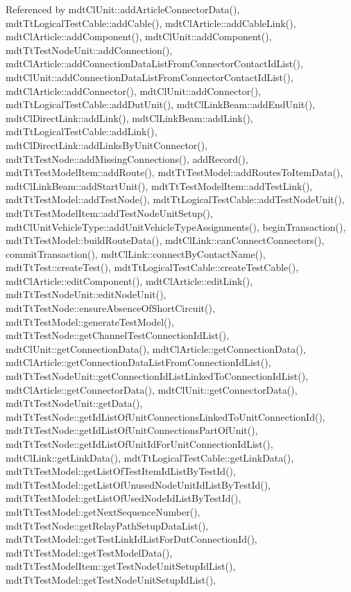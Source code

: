 Referenced by mdt\-Cl\-Unit\-::add\-Article\-Connector\-Data(), mdt\-Tt\-Logical\-Test\-Cable\-::add\-Cable(), mdt\-Cl\-Article\-::add\-Cable\-Link(), mdt\-Cl\-Article\-::add\-Component(), mdt\-Cl\-Unit\-::add\-Component(), mdt\-Tt\-Test\-Node\-Unit\-::add\-Connection(), mdt\-Cl\-Article\-::add\-Connection\-Data\-List\-From\-Connector\-Contact\-Id\-List(), mdt\-Cl\-Unit\-::add\-Connection\-Data\-List\-From\-Connector\-Contact\-Id\-List(), mdt\-Cl\-Article\-::add\-Connector(), mdt\-Cl\-Unit\-::add\-Connector(), mdt\-Tt\-Logical\-Test\-Cable\-::add\-Dut\-Unit(), mdt\-Cl\-Link\-Beam\-::add\-End\-Unit(), mdt\-Cl\-Direct\-Link\-::add\-Link(), mdt\-Cl\-Link\-Beam\-::add\-Link(), mdt\-Tt\-Logical\-Test\-Cable\-::add\-Link(), mdt\-Cl\-Direct\-Link\-::add\-Links\-By\-Unit\-Connector(), mdt\-Tt\-Test\-Node\-::add\-Missing\-Connections(), add\-Record(), mdt\-Tt\-Test\-Model\-Item\-::add\-Route(), mdt\-Tt\-Test\-Model\-::add\-Routes\-To\-Item\-Data(), mdt\-Cl\-Link\-Beam\-::add\-Start\-Unit(), mdt\-Tt\-Test\-Model\-Item\-::add\-Test\-Link(), mdt\-Tt\-Test\-Model\-::add\-Test\-Node(), mdt\-Tt\-Logical\-Test\-Cable\-::add\-Test\-Node\-Unit(), mdt\-Tt\-Test\-Model\-Item\-::add\-Test\-Node\-Unit\-Setup(), mdt\-Cl\-Unit\-Vehicle\-Type\-::add\-Unit\-Vehicle\-Type\-Assignments(), begin\-Transaction(), mdt\-Tt\-Test\-Model\-::build\-Route\-Data(), mdt\-Cl\-Link\-::can\-Connect\-Connectors(), commit\-Transaction(), mdt\-Cl\-Link\-::connect\-By\-Contact\-Name(), mdt\-Tt\-Test\-::create\-Test(), mdt\-Tt\-Logical\-Test\-Cable\-::create\-Test\-Cable(), mdt\-Cl\-Article\-::edit\-Component(), mdt\-Cl\-Article\-::edit\-Link(), mdt\-Tt\-Test\-Node\-Unit\-::edit\-Node\-Unit(), mdt\-Tt\-Test\-Node\-::ensure\-Absence\-Of\-Short\-Circuit(), mdt\-Tt\-Test\-Model\-::generate\-Test\-Model(), mdt\-Tt\-Test\-Node\-::get\-Channel\-Test\-Connection\-Id\-List(), mdt\-Cl\-Unit\-::get\-Connection\-Data(), mdt\-Cl\-Article\-::get\-Connection\-Data(), mdt\-Cl\-Article\-::get\-Connection\-Data\-List\-From\-Connection\-Id\-List(), mdt\-Tt\-Test\-Node\-Unit\-::get\-Connection\-Id\-List\-Linked\-To\-Connection\-Id\-List(), mdt\-Cl\-Article\-::get\-Connector\-Data(), mdt\-Cl\-Unit\-::get\-Connector\-Data(), mdt\-Tt\-Test\-Node\-Unit\-::get\-Data(), mdt\-Tt\-Test\-Node\-::get\-Id\-List\-Of\-Unit\-Connections\-Linked\-To\-Unit\-Connection\-Id(), mdt\-Tt\-Test\-Node\-::get\-Id\-List\-Of\-Unit\-Connections\-Part\-Of\-Unit(), mdt\-Tt\-Test\-Node\-::get\-Id\-List\-Of\-Unit\-Id\-For\-Unit\-Connection\-Id\-List(), mdt\-Cl\-Link\-::get\-Link\-Data(), mdt\-Tt\-Logical\-Test\-Cable\-::get\-Link\-Data(), mdt\-Tt\-Test\-Model\-::get\-List\-Of\-Test\-Item\-Id\-List\-By\-Test\-Id(), mdt\-Tt\-Test\-Model\-::get\-List\-Of\-Unused\-Node\-Unit\-Id\-List\-By\-Test\-Id(), mdt\-Tt\-Test\-Model\-::get\-List\-Of\-Used\-Node\-Id\-List\-By\-Test\-Id(), mdt\-Tt\-Test\-Model\-::get\-Next\-Sequence\-Number(), mdt\-Tt\-Test\-Node\-::get\-Relay\-Path\-Setup\-Data\-List(), mdt\-Tt\-Test\-Model\-::get\-Test\-Link\-Id\-List\-For\-Dut\-Connection\-Id(), mdt\-Tt\-Test\-Model\-::get\-Test\-Model\-Data(), mdt\-Tt\-Test\-Model\-Item\-::get\-Test\-Node\-Unit\-Setup\-Id\-List(), mdt\-Tt\-Test\-Model\-::get\-Test\-Node\-Unit\-Setup\-Id\-List(), 